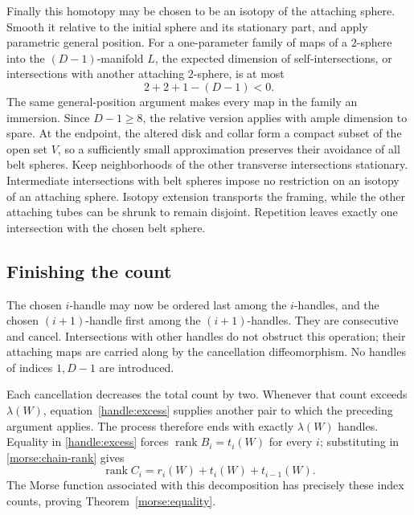 Finally this homotopy may be chosen to be an isotopy of the attaching
sphere.  Smooth it relative to the initial sphere and its stationary
part, and apply parametric general position.  For a one-parameter
family of maps of a $2$-sphere into the $(D-1)$-manifold $L$, the
expected dimension of self-intersections, or intersections with another
attaching $2$-sphere, is at most
\[
 2+2+1-(D-1)<0.
\]
The same general-position argument makes every map in the family an
immersion.  Since $D-1\geq8$, the relative version applies with ample
dimension to spare.  At the endpoint, the altered disk and collar form
a compact subset of the open set $V$, so a sufficiently small
approximation preserves their avoidance of all belt spheres.
Keep neighborhoods of the other transverse intersections stationary.
Intermediate intersections with belt spheres impose no restriction on
an isotopy of an attaching sphere.  Isotopy extension transports the
framing, while the other attaching tubes can be shrunk to remain
disjoint.  Repetition leaves exactly one intersection with the chosen
belt sphere.

\subsection{Finishing the count}

The chosen $i$-handle may now be ordered last among the $i$-handles,
and the chosen $(i+1)$-handle first among the $(i+1)$-handles.
They are consecutive and cancel.  Intersections with other handles do
not obstruct this operation; their attaching maps are carried along
by the cancellation diffeomorphism.
No handles of indices $1,D-1$ are introduced.

Each cancellation decreases the total count by two.  Whenever that
count exceeds $\lambda(W)$, equation~\eqref{handle:excess} supplies
another pair to which the preceding argument applies.  The process
therefore ends with exactly $\lambda(W)$ handles.  Equality in
\eqref{handle:excess} forces
$\operatorname{rank}B_i=t_i(W)$ for every $i$; substituting in
\eqref{morse:chain-rank} gives
\[
 \operatorname{rank}C_i=r_i(W)+t_i(W)+t_{i-1}(W).
\]
The Morse function associated with this decomposition has precisely
these index counts, proving Theorem~\ref{morse:equality}.
